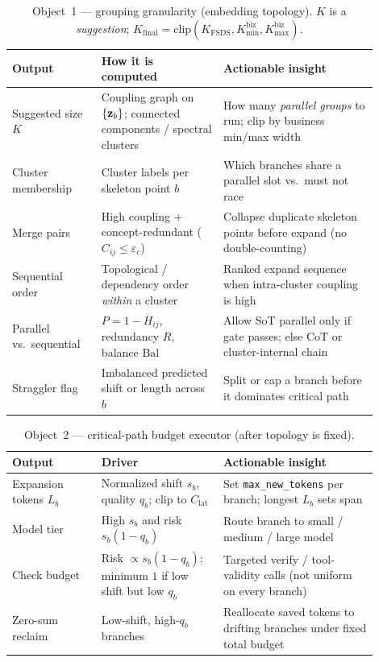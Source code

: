 \begin{table}[t]
\centering
\small
\caption{Object~1 --- grouping granularity (embedding topology). $K$ is a
\emph{suggestion}; $K_{\mathrm{final}}=\mathrm{clip}(K_{\mathrm{FSDS}},K_{\min}^{\mathrm{biz}},K_{\max}^{\mathrm{biz}})$.}
\label{tab:obj1-topology}
\begin{tabular}{@{}p{0.22\linewidth}p{0.30\linewidth}p{0.38\linewidth}@{}}
\toprule
Output & How it is computed & Actionable insight \\
\midrule
Suggested size $K$ &
Coupling graph on $\{\mathbf{z}_b\}$; connected components / spectral clusters &
How many \emph{parallel groups} to run; clip by business min/max width \\
Cluster membership &
Cluster labels per skeleton point $b$ &
Which branches share a parallel slot vs.\ must not race \\
Merge pairs &
High coupling + concept-redundant ($C_{ij}\le\varepsilon_c$) &
Collapse duplicate skeleton points before expand (no double-counting) \\
Sequential order &
Topological / dependency order \emph{within} a cluster &
Ranked expand sequence when intra-cluster coupling is high \\
Parallel vs.\ sequential &
$P=1-\overline{H}_{ij}$, redundancy $R$, balance $\mathrm{Bal}$ &
Allow SoT parallel only if gate passes; else CoT or cluster-internal chain \\
Straggler flag &
Imbalanced predicted shift or length across $b$ &
Split or cap a branch before it dominates critical path \\
\bottomrule
\end{tabular}
\end{table}

\begin{table}[t]
\centering
\small
\caption{Object~2 --- critical-path budget executor (after topology is fixed).}
\label{tab:obj2-budget}
\begin{tabular}{@{}p{0.22\linewidth}p{0.30\linewidth}p{0.38\linewidth}@{}}
\toprule
Output & Driver & Actionable insight \\
\midrule
Expansion tokens $L_b$ &
Normalized shift $s_b$, quality $q_b$; clip to $C_{\mathrm{lat}}$ &
Set \texttt{max\_new\_tokens} per branch; longest $L_b$ sets span \\
Model tier &
High $s_b$ and risk $s_b(1-q_b)$ &
Route branch to small / medium / large model \\
Check budget &
Risk $\propto s_b(1-q_b)$; minimum $1$ if low shift but low $q_b$ &
Targeted verify / tool-validity calls (not uniform on every branch) \\
Zero-sum reclaim &
Low-shift, high-$q_b$ branches &
Reallocate saved tokens to drifting branches under fixed total budget \\
\bottomrule
\end{tabular}
\end{table}

